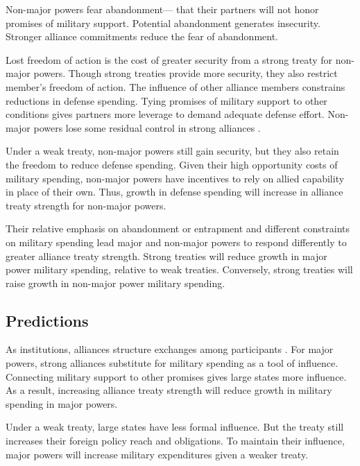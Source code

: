 \documentclass[12pt]{article}
\begin{document}
Non-major powers fear abandonment--- that their partners will not honor promises of military support.
Potential abandonment generates insecurity. 
Stronger alliance commitments reduce the fear of abandonment. 


Lost freedom of action is the cost of greater security from a strong treaty for non-major powers.
Though strong treaties provide more security, they also restrict member's freedom of action. 
The influence of other alliance members constrains reductions in defense spending.
Tying promises of military support to other conditions gives partners more leverage to demand adequate defense effort. 
Non-major powers lose some residual control in strong alliances \citep{Lake1996}. 


Under a weak treaty, non-major powers still gain security, but they also retain the freedom to reduce defense spending.    
Given their high opportunity costs of military spending, non-major powers have incentives to rely on allied capability in place of their own. 
Thus, growth in defense spending will increase in alliance treaty strength for non-major powers. 


Their relative emphasis on abandonment or entrapment and different constraints on military spending lead major and non-major powers to respond differently to greater alliance treaty strength. 
Strong treaties will reduce growth in major power military spending, relative to weak treaties. 
Conversely, strong treaties will raise growth in non-major power military spending. 

 


\subsection{Predictions} 

 
As institutions, alliances structure exchanges among participants \citep{Williamson1985, North1990, DiermeierKrehbiel2003}.
For major powers, strong alliances substitute for military spending as a tool of influence. 
Connecting military support to other promises gives large states more influence.
As a result, increasing alliance treaty strength will reduce growth in military spending in major powers. 


Under a weak treaty, large states have less formal influence. 
But the treaty still increases their foreign policy reach and obligations. 
To maintain their influence, major powers will increase military expenditures given a weaker treaty. 
\end{document}
